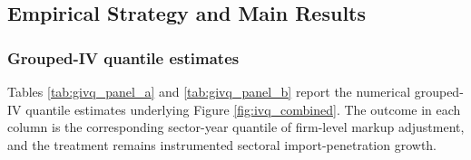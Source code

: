 ﻿\documentclass[12pt]{article}
\begin{document}
\subsection{Empirical Strategy and Main Results}

\subsubsection{Grouped-IV quantile estimates}
\renewcommand{\arraystretch}{0.9}

Tables \ref{tab:givq_panel_a} and \ref{tab:givq_panel_b} report the numerical grouped-IV quantile estimates underlying Figure \ref{fig:ivq_combined}. The outcome in each column is the corresponding sector-year quantile of firm-level markup adjustment, and the treatment remains instrumented sectoral import-penetration growth.
\end{document}
